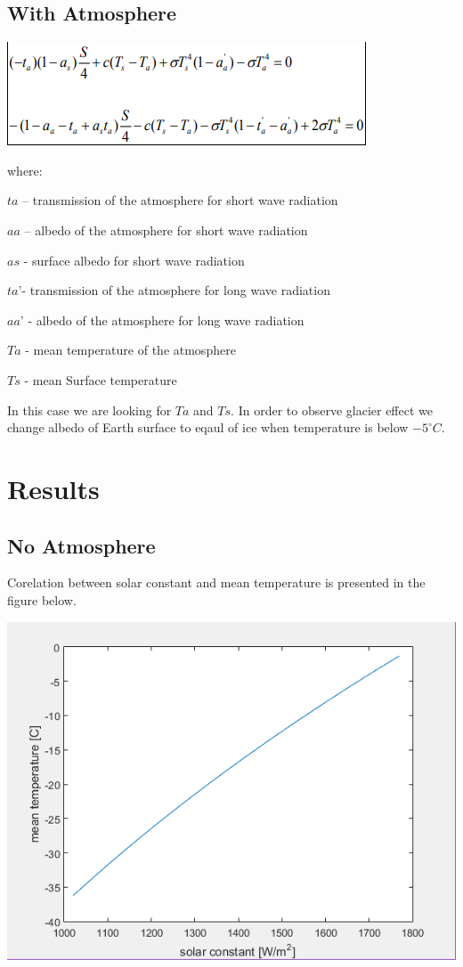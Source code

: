 \documentclass[a4paper,12pt]{article}
\begin{document}
\subsection{With Atmosphere}
\centerline{\includegraphics[scale=1]{eq}}
where:
\begin{description}
\item $ta$ – transmission of the atmosphere for short wave radiation
\item $aa$ – albedo of the atmosphere for short wave radiation
\item $as$ - surface albedo for short wave radiation
\item $ta’$- transmission of the atmosphere for long wave radiation
\item $aa’$ - albedo of the atmosphere for long wave radiation
\item $Ta$ - mean temperature of the atmosphere
\item $Ts$ - mean Surface temperature
\end{description}
In this case we are looking for $Ta$ and $Ts$. In order to observe glacier effect we change albedo of Earth surface to eqaul of ice when temperature is below $-5^\circ C$.
\section{Results}
\subsection{No Atmosphere}
Corelation between solar constant and mean temperature is presented in the figure below.
\centerline{\includegraphics[scale=1]{fig1}}
\end{document}

